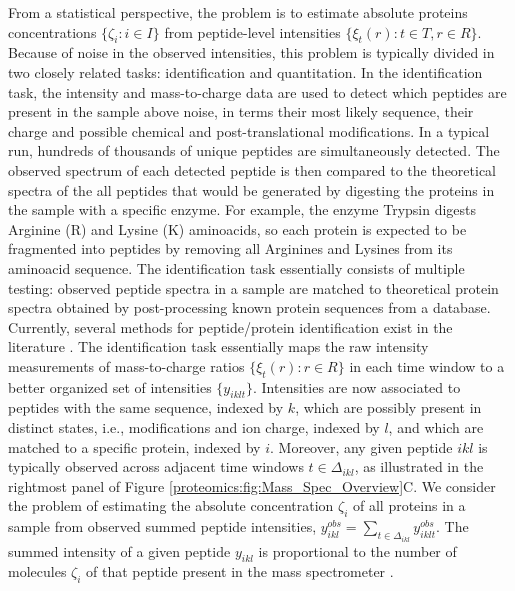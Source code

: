 

From a statistical perspective, 
the problem is to estimate absolute proteins concentrations $\{\zeta_i:i\in I\}$ from peptide-level intensities $\{\xi_t(r):t\in T,r\in R\}$.
Because of noise in the observed intensities, this problem is typically divided in two closely related tasks: identification and quantitation.
%
 In the identification task, the intensity and mass-to-charge data are used to detect which peptides are present in the sample above noise, in terms their most likely sequence, their charge and possible chemical and post-translational modifications. In a typical run, hundreds of thousands of unique peptides are simultaneously detected. The observed spectrum of each detected peptide is then compared to the theoretical spectra of the all peptides that would be generated by digesting the proteins in the sample with a specific enzyme. 
For example, the enzyme Trypsin digests Arginine (R) and Lysine (K) aminoacids, so each protein is expected to be fragmented into peptides by removing all Arginines and Lysines from its aminoacid sequence.
The identification task essentially consists of multiple testing: observed peptide spectra in a sample are matched to theoretical protein spectra obtained by post-processing known protein sequences from a database. 
Currently, several methods for peptide/protein identification  exist in the literature \citep{.}.
The identification task essentially maps the raw intensity measurements of mass-to-charge ratios $\{\xi_t(r) : r\in R\}$ in each time window to a better organized set of intensities $\{y_{iklt}\}$. Intensities are now associated to peptides with the same sequence, indexed by $k$, which are possibly present in distinct states, i.e., modifications and ion charge, indexed by $l$, and which are matched to a specific protein, indexed by $i$. 
%
Moreover, any given peptide $ikl$ is typically observed across adjacent time windows $t\in\Delta_{ikl}$, as illustrated in the rightmost panel of Figure \ref{proteomics:fig:Mass_Spec_Overview}C.
%
We consider the problem of estimating the absolute concentration $\zeta_i$ of all proteins in a sample from observed summed peptide intensities, $y_{ikl}^{obs} = \sum_{t\in\Delta_{ikl}} y_{iklt}^{obs}$. The summed intensity of a given peptide $y_{ikl}$ is proportional to the number of  molecules $\zeta_i$ of that peptide present in the mass spectrometer \citep{Old:2005jf,Scigelova:2011dt}.


